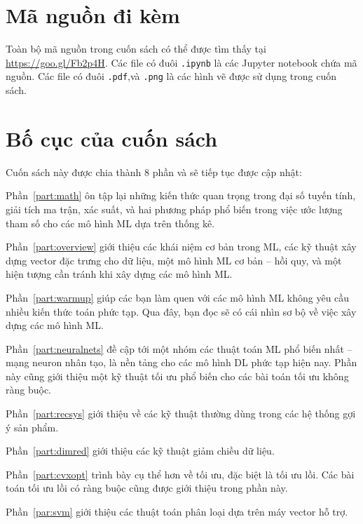 \section{Mã nguồn đi kèm}
Toàn bộ mã nguồn trong cuốn sách có thể được tìm thấy tại
\url{https://goo.gl/Fb2p4H}. Các file có đuôi \texttt{.ipynb} là các
Jupyter notebook chứa mã nguồn. Các file có đuôi \texttt{.pdf},và \texttt{.png}
là các hình vẽ được sử dụng trong cuốn sách.

\section{Bố cục của cuốn sách}
Cuốn sách này được chia thành 8 phần và sẽ tiếp tục được cập nhật:

{Phần~\ref{part:math}} ôn tập lại những kiến thức quan trọng trong đại số tuyến
tính, giải tích ma trận, xác suất, và hai phương pháp phổ biến trong việc ước
lượng tham số cho các mô hình ML dựa trên thống kê.

Phần~\ref{part:overview} giới thiệu các khái niệm cơ bản trong ML, các kỹ thuật
xây dựng vector đặc trưng cho dữ liệu, một mô hình ML cơ bản -- hồi quy, và một hiện tượng cần tránh khi xây dựng các mô hình ML.

Phần~\ref{part:warmup} giúp các bạn làm quen với các mô hình ML không yêu cầu
nhiều kiến thức toán phức tạp. Qua đây, bạn đọc sẽ có cái nhìn sơ bộ về việc xây
dựng các mô hình ML.


Phần~\ref{part:neuralnets} đề cập tới một nhóm các thuật toán ML phổ biến nhất
-- mạng neuron nhân tạo, là nền tảng cho các mô hình DL phức tạp
hiện nay. Phần này cũng giới thiệu một kỹ thuật tối ưu phổ biến cho các bài toán
tối ưu không ràng buộc.

Phần~\ref{part:recsys} giới thiệu về các kỹ thuật thường dùng trong các hệ thống
gợi ý sản phẩm.

Phần~\ref{part:dimred} giới thiệu các kỹ thuật giảm chiều dữ liệu.

Phần~\ref{part:cvxopt} trình bày cụ thể hơn về tối ưu, đặc biệt là tối ưu lồi.
Các bài toán tối ưu lồi có ràng buộc cũng được giới thiệu trong phần này.

Phần~\ref{par:svm} giới thiệu các thuật toán phân loại dựa trên máy vector hỗ trợ.


